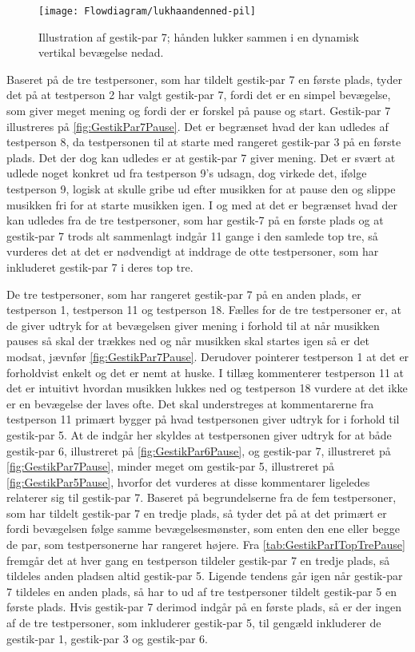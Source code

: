 %
\begin{figure}[H]
	\centering
	\texttt{[image: Flowdiagram/lukhaandenned-pil]}
	\caption{Illustration af gestik-par 7; hånden lukker sammen i en dynamisk vertikal bevægelse nedad.}
	\label{fig:GestikPar7Pause}
\end{figure}
\noindent
%
Baseret på de tre testpersoner, som har tildelt gestik-par 7 en første plads, tyder det på at testperson 2 har valgt gestik-par 7, fordi det er en simpel bevægelse, som giver meget mening og fordi der er forskel på pause og start. Gestik-par 7 illustreres på \autoref{fig:GestikPar7Pause}. Det er begrænset hvad der kan udledes af testperson 8, da testpersonen til at starte med rangeret gestik-par 3 på en første plads. Det der dog kan udledes er at gestik-par 7 giver mening. Det er svært at udlede noget konkret ud fra testperson 9's udsagn, dog virkede det, ifølge testperson 9, logisk at skulle gribe ud efter musikken for at pause den og slippe musikken fri for at starte musikken igen. I og med at det er begrænset hvad der kan udledes fra de tre testpersoner, som har gestik-7 på en første plads og at gestik-par 7 trods alt sammenlagt indgår 11 gange i den samlede top tre, så vurderes det at det er nødvendigt at inddrage de otte testpersoner, som har inkluderet gestik-par 7 i deres top tre. 

De tre testpersoner, som har rangeret gestik-par 7 på en anden plads, er testperson 1, testperson 11 og testperson 18. Fælles for de tre testpersoner er, at de giver udtryk for at bevægelsen giver mening i forhold til at når musikken pauses så skal der trækkes ned og når musikken skal startes igen så er det modsat, jævnfør \autoref{fig:GestikPar7Pause}. Derudover pointerer testperson 1 at det er forholdvist enkelt og det er nemt at huske. I tillæg kommenterer testperson 11 at det er intuitivt hvordan musikken lukkes ned og testperson 18 vurdere at det ikke er en bevægelse der laves ofte. Det skal understreges at kommentarerne fra testperson 11 primært bygger på hvad testpersonen giver udtryk for i forhold til gestik-par 5. At de indgår her skyldes at testpersonen giver udtryk for at både gestik-par 6, illustreret på \autoref{fig:GestikPar6Pause}, og gestik-par 7, illustreret på \autoref{fig:GestikPar7Pause}, minder meget om gestik-par 5, illustreret på \autoref{fig:GestikPar5Pause}, hvorfor det vurderes at disse kommentarer ligeledes relaterer sig til gestik-par 7. Baseret på begrundelserne fra de fem testpersoner, som har tildelt gestik-par 7 en tredje plads, så tyder det på at det primært er fordi bevægelsen følge samme bevægelsesmønster, som enten den ene eller begge de par, som testpersonerne har rangeret højere. Fra \autoref{tab:GestikParITopTrePause} fremgår det at hver gang en testperson tildeler gestik-par 7 en tredje plads, så tildeles anden pladsen altid gestik-par 5. Ligende tendens går igen når gestik-par 7 tildeles en anden plads, så har to ud af tre testpersoner tildelt gestik-par 5 en første plads. Hvis gestik-par 7 derimod indgår på en første plads, så er der ingen af de tre testpersoner, som inkluderer gestik-par 5, til gengæld inkluderer de gestik-par 1, gestik-par 3 og gestik-par 6. 

